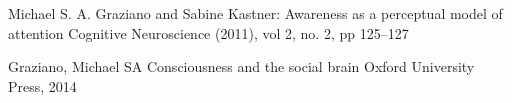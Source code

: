\documentclass[citeauthoryear]{llncs}
\begin{document}
%
%
\begin{thebibliography}{}
%
\newcommand{\mytilde}{\raise.17ex\hbox{$\scriptstyle\mathtt{\sim}$}}










Michael S. A.   Graziano  and  Sabine   Kastner:
Awareness as a perceptual model of attention
Cognitive Neuroscience (2011), vol 2, no. 2, pp 125--127


Graziano, Michael SA
Consciousness and the social brain
Oxford University Press, 2014



\end{thebibliography}
\end{document}
